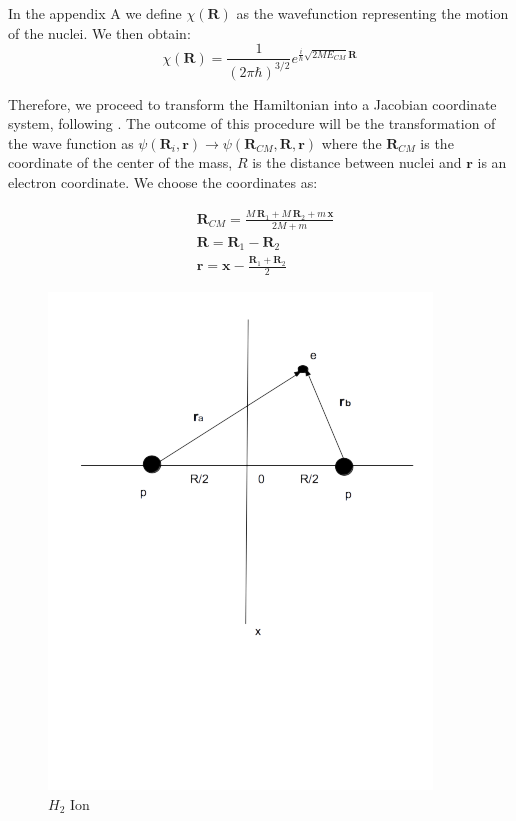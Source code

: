 In the appendix A we define $ \chi(\mathbf{R}) $ as the wavefunction representing the motion of the nuclei. We then  obtain:
\begin{equation}
\chi(\mathbf{R}) = \frac{1}{(2\pi\hbar)^{3/2}}e^{\frac{i}{\hbar}\sqrt{2ME_{CM}}\mathbf{R}}
\end{equation}

Therefore, we proceed to transform the Hamiltonian into a Jacobian coordinate system, following \cite{ZygelmanDalgarno1}. The outcome of this procedure will be the transformation of the wave function as $\psi(\mathbf{R}_i, \mathbf{r}) \rightarrow \psi(\mathbf{R}_{CM}, \mathbf{R}, \mathbf{r}) $ where the $ \mathbf{R}_{CM} $ is the coordinate of the center of the mass, $ R $ is the distance between nuclei and $ \mathbf{r} $ is an electron coordinate.
We choose the coordinates as:

\begin{equation}
\begin{split}
& \mathbf{R}_{CM} = \frac{M\,\mathbf{R}_1 + M\,\mathbf{R}_2 + m\,\mathbf{x}}{2M + m} \\[.8em]
& \mathbf{R} = \mathbf{R}_1 - \mathbf{R}_2 \\[.8em]
& \mathbf{r} = \mathbf{x} - \frac{\mathbf{R}_1 + \mathbf{R}_2}{2}
\end{split}
\end{equation}

\begin{figure}
  \includegraphics{H2Ion3D.png}
  \caption{$ H_2 $ Ion}\label{h2ion3d}
\end{figure}

